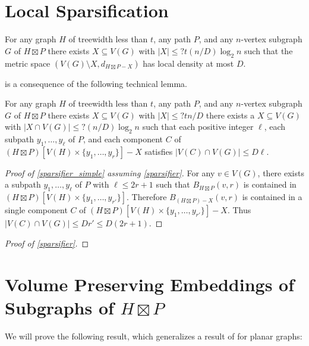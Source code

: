 \documentclass{patmorin}
\begin{document}
\section{Local Sparsification}


\begin{lem}\label{sparsifier_simple}
  For any graph $H$ of treewidth less than $t$, any path $P$, and any $n$-vertex subgraph $G$ of $H\boxtimes P$ there exists $X\subseteq V(G)$ with $|X|\le ?t(n/D)\log_2 n$ such that the metric space $(V(G)\setminus X, d_{H\boxtimes P-X})$ has local density at most $D$.
\end{lem}

 is a consequence of the following technical lemma.

\begin{lem}\label{sparsifier}
  For any graph $H$ of treewidth less than $t$, any path $P$, and any $n$-vertex subgraph $G$ of $H\boxtimes P$ there exists $X\subseteq V(G)$ with $|X|\le ?tn/D$  there exists a $X\subseteq V(G)$ with $|X\cap V(G)|\le ?(n/D)\log_2 n$ such that each positive integer $\ell$, each subpath $y_1,\ldots,y_\ell$ of $P$, and each component $C$ of $(H\boxtimes P)[V(H)\times \{y_1,\ldots,y_r\}]-X$ satisfies $|V(C)\cap V(G)|\le D\ell$.
\end{lem}

\begin{proof}[Proof of \cref{sparsifier_simple} assuming \cref{sparsifier}]
  For any $v\in V(G)$, there exists a subpath $y_1,\ldots,y_{\ell}$ of $P$ with $\ell\le 2r+1$ such that $B_{H\boxtimes P}(v,r)$ is contained in $(H\boxtimes P)[V(H)\times \{y_1,\ldots,y_{r'}\}]$.  Therefore $B_{(H\boxtimes P)-X}(v,r)$ is contained in a single component $C$ of $(H\boxtimes P)[V(H)\times \{y_1,\ldots,y_{r'}\}]-X$.  Thus $|V(C)\cap V(G)|\le Dr'\le D(2r+1)$.
\end{proof}

\begin{proof}[Proof of \cref{sparsifier}]
\end{proof}


\section{\boldmath Volume Preserving Embeddings of Subgraphs of $H\boxtimes P$}



We will prove the following result, which generalizes a result of \citet{rao:small} for planar graphs:
\end{document}

